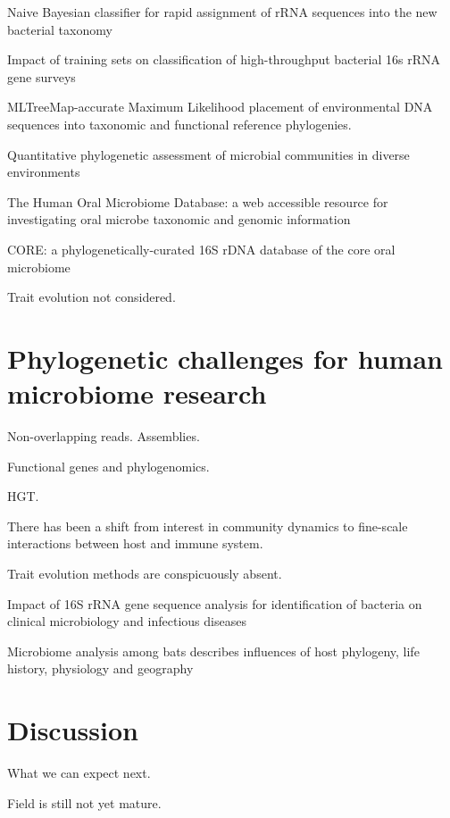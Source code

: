 \documentclass{amsart}
\newcommand{\forarxiv}[1]{#1}
\newcommand{\notforarxiv}[1]{}
\newcommand{\FIGmassTransport}{\
\begin{figure}[ht]
\begin{center}
  \forarxiv{\texttt{[image: mass\_transport.pdf]}}
\end{center}
\caption{\
  Caption goes here.
}
\label{FIGmassTransport}
\end{figure}
}
\begin{document}
\cite{wang2007naive}
{Naive Bayesian classifier for rapid assignment of rRNA sequences into the new bacterial taxonomy}

\cite{werner2011impact}
Impact of training sets on classification of high-throughput bacterial 16s rRNA gene surveys


\cite{stark2010mltreemap}
{{MLTreeMap}-accurate Maximum Likelihood placement of environmental DNA sequences into taxonomic and functional reference phylogenies.}

\cite{vonMeringEaQuantitative08}
{Quantitative phylogenetic assessment of microbial communities in diverse environments}

\cite{case2007rpob}

\cite{chen2010human}
The Human Oral Microbiome Database: a web accessible resource for investigating oral microbe taxonomic and genomic information

\cite{griffen2011core}
CORE: a phylogenetically-curated 16S rDNA database of the core oral microbiome

\cite{srinivasan2012bacterial}

Trait evolution not considered.


\section{Phylogenetic challenges for human microbiome research}

Non-overlapping reads.
Assemblies.

Functional genes and phylogenomics.

HGT.

There has been a shift from interest in community dynamics to fine-scale interactions between host and immune system.

Trait evolution methods are conspicuously absent.

\cite{wylie2012sequence}
\cite{chen2012associating}

\cite{clarridge2004}
{{I}mpact of 16{S} r{RNA} gene sequence analysis for identification of bacteria on clinical microbiology and infectious diseases}

\cite{phillips2012microbiome}
Microbiome analysis among bats describes influences of host phylogeny, life history, physiology and geography



\section{Discussion}

What we can expect next.

Field is still not yet mature.

\notforarxiv{
\newpage
\section{Figure Legends}
\clearpage

\newpage
}



\end{document}
